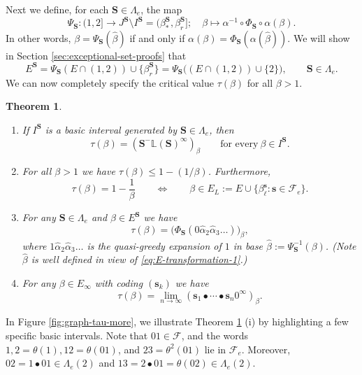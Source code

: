 \documentclass[12pt]{amsart}
\newtheorem{theorem}{Theorem}[section]
\theoremstyle{definition}
\theoremstyle{remark}
\numberwithin{equation}{section}
\renewcommand{\L}{\ensuremath{\mathbb{L}}}
\newcommand{\cF}{\mathcal{F}}
\newcommand{\s}{ {\mathbf{s}}}
\newcommand{\cs}{ {\mathbf{S}}}
\newcommand{\f}{\infty}
\newcommand{\al}{\alpha}
\newcommand{\La}{\Lambda}
\begin{document}
{Next we define, for each $\cs\in\La_e$, the map
\begin{equation} \label{eq:Psi-S}
\Psi_\cs: (1,2]\to  J^\cs\setminus I^\cs=(\beta_*^\cs, \beta_r^\cs];\quad \beta\mapsto \al^{-1}\circ\Phi_\cs\circ\al(\beta).
\end{equation}
In other words, $\beta=\Psi_\cs(\hat{\beta})$ if and only if $\al(\beta)=\Phi_\cs(\al(\hat{\beta}))$. {We will show in Section \ref{sec:exceptional-set-proofs} that
\begin{equation} \label{eq:E-transformation-1}
E^\cs=\Psi_\cs(E\cap(1,2))\cup\{\beta_r^\cs\}=\Psi_\cs\big((E\cap(1,2))\cup\{2\}\big), \qquad \cs\in\La_e.
\end{equation}
}
We can now completely specify the critical value $\tau(\beta)$ for all $\beta>1$.

\begin{theorem} \label{thm:critical-values} \mbox{}
\begin{enumerate} [{\rm(i)}]
\item If $I^\cs$ is a basic interval generated by $\cs\in\La_e$, then
   \begin{equation} \label{eq:tau-in-basic-interval}
   \tau(\beta)=(\cs^-\L(\cs)^\f)_\beta\qquad\textrm{for {every}}\ \beta\in I^\cs.
   \end{equation}
\item For all $\beta>1$ we have $\tau(\beta)\leq 1-(1/\beta)$. Furthermore, 
\[
\tau(\beta)=1-\frac{1}{\beta} \qquad\Longleftrightarrow \qquad \beta\in E_L:=E\cup\{\beta_\ell^\s: \s\in\cF_e\}.
\]
\item For any $\cs\in\La_e$ and $\beta\in E^\cs$ we have
\[
\tau(\beta)= \big(\Phi_\cs(0\hat{\al}_2\hat{\al}_3\ldots)\big)_\beta,
\]
where $1\hat{\al}_2\hat{\al}_3\ldots$ is the quasi-greedy expansion of $1$ in base $\hat\beta:=\Psi_\cs^{-1}(\beta)$. {(Note $\hat\beta$ is well defined in view of \eqref{eq:E-transformation-1}.)}
\item For any $\beta\in E_\f$ with coding $(\s_k)$ we have
\[
\tau(\beta) =\lim_{n\to\f} (\s_1\bullet\cdots\bullet\s_n 0^\f)_\beta.
\]
\end{enumerate}
\end{theorem}

In Figure \ref{fig:graph-tau-more}, we illustrate Theorem \ref{thm:critical-values} (i) by highlighting a few specific basic intervals. 
Note that $01\in\cF$, and the words $1,2=\theta(1), 12=\theta(01)$, and $23=\theta^2(01)$ lie in $\cF_e$. Moreover, $02=1\bullet 01\in\La_e(2)$ and $13=2\bullet 01=\theta(02)\in\La_e(2)$.

}
\end{document}

